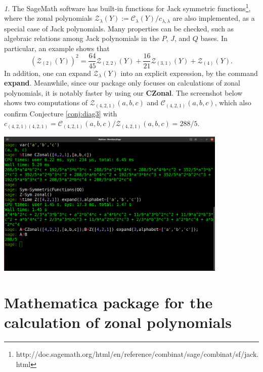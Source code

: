 \documentclass{mathincs}
\numberwithin{equation}{section}
\numberwithin{figure}{section}
\theoremstyle{plain}
\theoremstyle{definition}
\theoremstyle{remark}
\newtheorem{rem}[thm]{\protect\remarkname}
\theoremstyle{plain}
\theoremstyle{definition}
\theoremstyle{plain}
\theoremstyle{plain}
\providecommand{\remarkname}{Remark}
\begin{document}
\begin{rem}
The SageMath software has built-in functions for Jack symmetric
functions\footnote{http://doc.sagemath.org/html/en/reference/combinat/sage/combinat/sf/jack.html},
where the zonal polynomials
$\mathcal{Z}_{\lambda}(Y):=\mathcal{C}_\lambda(Y)/c_{\lambda,\lambda}$ are also
implemented, as a special case of Jack polynomials. Many properties can be
checked, such as algebraic relations among Jack polynomials in the $P$, $J$, and
$Q$ bases. In particular, an example shows that
\[
  \left(\mathcal{Z}_{(2)}(Y)\right)^2=\frac{64}{45}\mathcal{Z}_{(2, 2)}(Y) +
  \frac{16}{21}\mathcal{Z}_{(3, 1)}(Y) + \mathcal{Z}_{(4)}(Y).
\]
In addition, one can expand $\mathcal{Z}_{\lambda}(Y)$ into an explicit expression, by
the command \textbf{expand}. Meanwhile, since our package only focuses on
calculations of zonal polynomials, it is notably faster by using our
\textbf{CZonal}. The screenshot below shows two computations of
$\mathcal{Z}_{(4,2,1)}(a,b,c)$ and $\mathcal{C}_{(4,2,1)}(a,b,c)$,
which also confirm
Conjecture \ref{conj:diag3} with $c_{(4,2,1)(4,2,1)}=
\mathcal{C}_{(4,2,1)}(a,b,c)/\mathcal{Z}_{(4,2,1)}(a,b,c)=288/5$.
\begin{center}
\includegraphics[width=\textwidth, height=7cm]{Screenshot.jpg}
\end{center}
\end{rem}



\section{Mathematica package for the calculation of zonal polynomials}\label{sec:mma}
\end{document}
